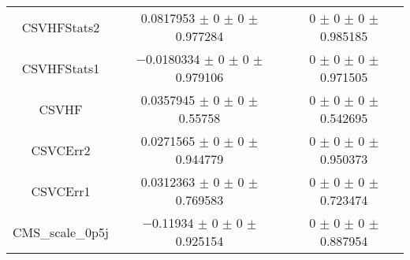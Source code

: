 \begin{table}
\begin{tabular}{ccc}
CSVHFStats2 	& \num{0.0817953} $\pm$ \num{0} $\pm$ \num{0} $\pm$ \num{0.977284} 	& \num{0} $\pm$ \num{0} $\pm$ \num{0} $\pm$ \num{0.985185}\\
CSVHFStats1 	& \num{-0.0180334} $\pm$ \num{0} $\pm$ \num{0} $\pm$ \num{0.979106} 	& \num{0} $\pm$ \num{0} $\pm$ \num{0} $\pm$ \num{0.971505}\\
CSVHF 	& \num{0.0357945} $\pm$ \num{0} $\pm$ \num{0} $\pm$ \num{0.55758} 	& \num{0} $\pm$ \num{0} $\pm$ \num{0} $\pm$ \num{0.542695}\\
CSVCErr2 	& \num{0.0271565} $\pm$ \num{0} $\pm$ \num{0} $\pm$ \num{0.944779} 	& \num{0} $\pm$ \num{0} $\pm$ \num{0} $\pm$ \num{0.950373}\\
CSVCErr1 	& \num{0.0312363} $\pm$ \num{0} $\pm$ \num{0} $\pm$ \num{0.769583} 	& \num{0} $\pm$ \num{0} $\pm$ \num{0} $\pm$ \num{0.723474}\\
CMS\_scale\_0p5j 	& \num{-0.11934} $\pm$ \num{0} $\pm$ \num{0} $\pm$ \num{0.925154} 	& \num{0} $\pm$ \num{0} $\pm$ \num{0} $\pm$ \num{0.887954}\\
\bottomrule
\end{tabular}
\end{table}